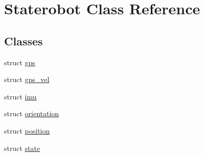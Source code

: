 \hypertarget{class_staterobot}{\section{\-Staterobot \-Class \-Reference}
\label{class_staterobot}
}
\subsection*{\-Classes}
\begin{DoxyCompactItemize}
\item 
struct \hyperlink{struct_staterobot_1_1gps}{gps}
\item 
struct \hyperlink{struct_staterobot_1_1gps__vel}{gps\-\_\-vel}
\item 
struct \hyperlink{struct_staterobot_1_1imu}{imu}
\item 
struct \hyperlink{struct_staterobot_1_1orientation}{orientation}
\item 
struct \hyperlink{struct_staterobot_1_1position}{position}
\item 
struct \hyperlink{struct_staterobot_1_1state}{state}
\end{DoxyCompactItemize}
